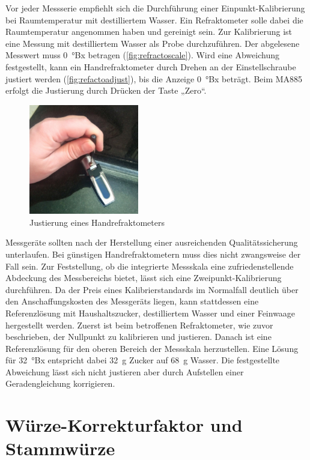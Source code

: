 \documentclass[a4paper,parskip=half]{scrartcl}
\begin{document}
Vor jeder Messserie empfiehlt sich die Durchführung einer
Einpunkt-Kalibrierung bei Raumtemperatur mit destilliertem
Wasser. Ein Refraktometer solle dabei die Raumtemperatur
angenommen haben und gereinigt sein. Zur Kalibrierung ist
eine Messung mit destilliertem Wasser als Probe durchzuführen.
Der abgelesene Messwert muss 0~°Bx betragen
(\autoref{fig:refractoscale}).
Wird eine Abweichung festgestellt, kann ein Handrefraktometer durch
Drehen an der Einstellschraube justiert werden (\autoref{fig:refactoadjust}),
bis die Anzeige 0~°Bx beträgt. Beim MA885 erfolgt die
Justierung durch Drücken der Taste „Zero“.
\autocite{Bonham2001,Depalma2017,Terrill2013}

\begin{figure}[h]
\centering
\includegraphics[width=4.8cm]{images/adjust.jpg}
\caption{Justierung eines Handrefraktometers}
\label{fig:refactoadjust}
\end{figure}

Messgeräte sollten nach der Herstellung einer ausreichenden
Qualitätssicherung unterlaufen. Bei günstigen Handrefraktometern
muss dies nicht zwangsweise der Fall sein. Zur Feststellung,
ob die integrierte Messskala eine zufriedenstellende Abdeckung
des Messbereichs bietet, lässt sich eine Zweipunkt-Kalibrierung
durchführen. Da der Preis eines Kalibrierstandards im Normalfall
deutlich über den Anschaffungskosten des Messgeräts
liegen, kann stattdessen eine Referenzlösung mit Haushaltszucker,
destilliertem Wasser und einer Feinwaage hergestellt werden. Zuerst
ist beim betroffenen Refraktometer, wie zuvor beschrieben, der
Nullpunkt zu kalibrieren und justieren. Danach ist eine Referenzlösung
für den oberen Bereich der Messskala herzustellen. Eine Lösung 
für 32~°Bx entspricht dabei 32~g Zucker auf 68~g Wasser.
Die festgestellte Abweichung lässt sich nicht justieren aber
durch Aufstellen einer Geradengleichung korrigieren.
\autocite{Earl2015,Terrill2013,Troester2012}

\section*{Würze-Korrekturfaktor und Stammwürze}
\end{document}
